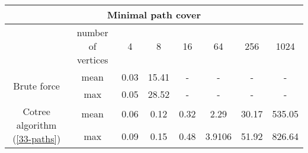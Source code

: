 \begin{center}
    \begin{tabular}{|c|c|c|c|c|c|c|c|}
        \hline
        \multicolumn{8}{|c|}{Minimal path cover}                                                                                \\
        \hline
                                                           & number of vertices & 4    & 8     & 16   & 64     & 256   & 1024   \\
        \hline

        \multirow{2}{*}{Brute force}                       & mean               & 0.03 & 15.41 & -    & -      & -     & -      \\
                                                           & max                & 0.05 & 28.52 & -    & -      & -     & -      \\
        \hline
        \multirow{2}{*}{Cotree algorithm (\ref{33-paths})} & mean               & 0.06 & 0.12  & 0.32 & 2.29   & 30.17 & 535.05 \\
                                                           & max                & 0.09 & 0.15  & 0.48 & 3.9106 & 51.92 & 826.64 \\
        \hline
    \end{tabular}
\end{center}
